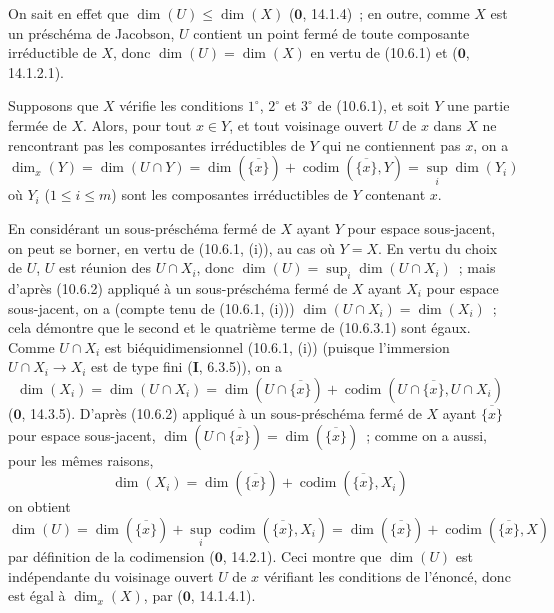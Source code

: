 On sait en effet que $\dim(U)\leq\dim(X)$ ($\mathbf 0$, 14.1.4)~; en outre,
comme $X$ est un préschéma de Jacobson, $U$ contient un point fermé de toute
composante irréductible de $X$, donc $\dim(U)=\dim(X)$ en vertu de (10.6.1) et
($\mathbf 0$, 14.1.2.1).

\begin{proposition}[10.6.3]
\label{IV.10.6.3-fr}
Supposons que $X$ vérifie les conditions $1^\circ$, $2^\circ$ et $3^\circ$ de
(10.6.1), et soit $Y$ une partie fermée de $X$. Alors, pour tout $x\in Y$, et
tout voisinage ouvert $U$ de $x$ dans $X$ ne rencontrant pas les composantes
irréductibles de $Y$ qui ne contiennent pas $x$, on a
\begin{equation}
\label{IV.10.6.3.1-fr}
\tag{10.6.3.1}
\dim_x(Y)=\dim(U\cap Y)=\dim(\overline{\{x\}})
 +\operatorname{codim}(\overline{\{x\}},Y)=\sup_i\dim(Y_i)
\end{equation}
où $Y_i$ ($1\leq i\leq m$) sont les composantes irréductibles de $Y$ contenant
$x$.
\end{proposition}

En considérant un sous-préschéma fermé de $X$ ayant $Y$ pour espace sous-jacent,
on peut se borner, en vertu de (10.6.1, (i)), au cas où $Y=X$. En vertu du choix
de $U$, $U$ est réunion des $U\cap X_i$, donc
$\dim(U)=\sup_i\dim(U\cap X_i)$~; mais d'après (10.6.2) appliqué à un
sous-préschéma fermé de $X$ ayant $X_i$ pour espace sous-jacent, on a (compte
tenu de (10.6.1, (i))) $\dim(U\cap X_i)=\dim(X_i)$~; cela démontre que le second
et le quatrième terme de (10.6.3.1) sont égaux. Comme $U\cap X_i$ est
biéquidimensionnel (10.6.1, (i)) (puisque l'immersion $U\cap X_i\to X_i$ est de
type fini (\textbf{I}, 6.3.5)), on a
\begin{equation}
\label{IV.10.6.3.2-fr}
\tag{10.6.3.2}
\dim(X_i)=\dim(U\cap X_i)=\dim(U\cap\overline{\{x\}})
 +\operatorname{codim}(U\cap\overline{\{x\}},U\cap X_i)
\end{equation}
($\mathbf 0$, 14.3.5). D'après (10.6.2) appliqué à un sous-préschéma fermé de
$X$ ayant $\overline{\{x\}}$ pour espace sous-jacent,
$\dim(U\cap\overline{\{x\}})=\dim(\overline{\{x\}})$~; comme on a aussi, pour les
mêmes raisons,
\begin{equation}
\label{IV.10.6.3.3-fr}
\tag{10.6.3.3}
\dim(X_i)=\dim(\overline{\{x\}})
 +\operatorname{codim}(\overline{\{x\}},X_i)
\end{equation}
on obtient
\[
  \dim(U)=\dim(\overline{\{x\}})
  +\sup_i\operatorname{codim}(\overline{\{x\}},X_i)
  =\dim(\overline{\{x\}})+\operatorname{codim}(\overline{\{x\}},X)
\]
par définition de la codimension ($\mathbf 0$, 14.2.1). Ceci montre que $\dim(U)$
est indépendante du voisinage ouvert $U$ de $x$ vérifiant les conditions de
l'énoncé, donc est égal à $\dim_x(X)$, par ($\mathbf 0$, 14.1.4.1).

